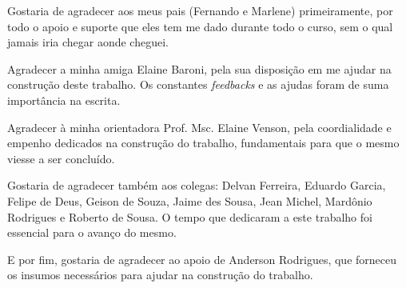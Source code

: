 \begin{agradecimentos}
\begin{comment}
A inclusão desta seção de agradecimentos é opcional, portanto, sua inclusão 
fica a critério do(s) autor(es), que caso deseje(em) fazê-lo deverá(ão) 
utilizar este espaço, seguindo a formatação de \textit{espaço simples e 
fonte padrão do texto (arial ou times, tamanho 12 sem negritos, aspas ou 
itálico}.
\end{comment}

Gostaria de agradecer aos meus pais (Fernando e Marlene) primeiramente, por todo o apoio e suporte que eles tem me dado durante todo o curso, sem o qual jamais iria chegar aonde cheguei.

Agradecer a minha amiga Elaine Baroni, pela sua disposição em me ajudar na construção deste trabalho. Os constantes \textit{feedbacks} e as ajudas foram de suma importância na escrita.

Agradecer à minha orientadora Prof. Msc. Elaine Venson, pela coordialidade e empenho dedicados na construção do trabalho, fundamentais para que o mesmo viesse a ser concluído.

Gostaria de agradecer também aos colegas: Delvan Ferreira, Eduardo Garcia, Felipe de Deus, Geison de Souza, Jaime des Sousa, Jean Michel, Mardônio Rodrigues e Roberto de Sousa. O tempo que dedicaram a este trabalho foi essencial para o avanço do mesmo.

E por fim, gostaria de agradecer ao apoio de Anderson Rodrigues, que forneceu os insumos necessários para ajudar na construção do trabalho.

\end{agradecimentos}
